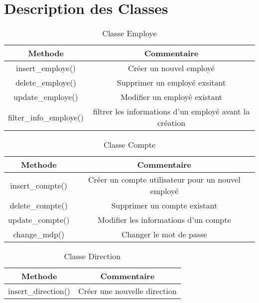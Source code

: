 \documentclass{report}
\begin{document}
\chapter{Description des Classes}
\label{a2}
\begin{table}[h!]
    \begin{center}
        \begin{tabular}{|c|c|}
            \hline
            \textbf{Methode} & \textbf{Commentaire}  \\
            \hline
            insert\_employe() & Créer un nouvel employé\\
            \hline
            delete\_employe()  & Supprimer un employé exsitant\\
            \hline
            update\_employe()  & Modifier un employé existant\\
            \hline
            filter\_info\_employe() & filtrer les informations d'un employé avant la création\\
            \hline
        \end{tabular}
    \end{center}
\caption{Classe Employe}
\end{table}

\begin{table}[h!]
    \begin{center}
        \begin{tabular}{|c|c|}
            \hline
            \textbf{Methode} & \textbf{Commentaire}  \\
            \hline
            insert\_compte() & Créer un compte utilisateur pour un nouvel employé\\
            \hline
            delete\_compte()  & Supprimer un compte existant\\
            \hline
            update\_compte()  & Modifier les informations d'un compte\\
            \hline
            change\_mdp() & Changer le mot de passe\\
            \hline
        \end{tabular}
    \end{center}
\caption{Classe Compte}
\end{table}

\begin{table}[h!]
    \begin{center}
        \begin{tabular}{|c|c|}
            \hline
            \textbf{Methode} & \textbf{Commentaire}  \\
            \hline
            insert\_direction() & Créer une nouvelle direction \\
            \hline
        \end{tabular}
    \end{center}
\caption{Classe Direction}
\end{table}
\end{document}
